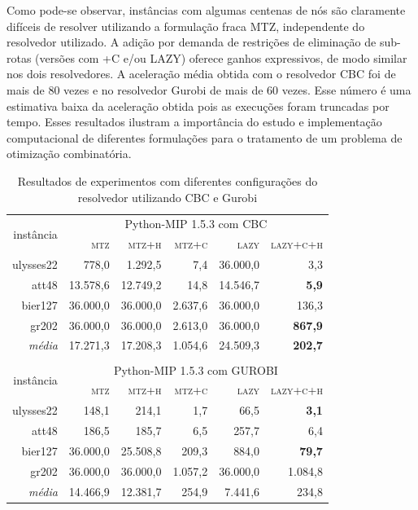 \documentclass[a4paper,11pt,fleqn]{article}
\begin{document}
Como pode-se observar, instâncias com algumas centenas de nós são claramente difíceis de resolver utilizando a formulação fraca MTZ, independente do resolvedor utilizado. A adição por demanda de restrições de eliminação de sub-rotas (versões com +C e/ou LAZY) oferece ganhos expressivos, de modo similar nos dois resolvedores. A aceleração média obtida com o resolvedor CBC foi de mais de 80 vezes e no resolvedor Gurobi de mais de 60 vezes. Esse número é uma estimativa baixa da aceleração obtida pois as execuções foram truncadas por tempo. Esses resultados ilustram a importância do estudo e implementação computacional de diferentes formulações para o tratamento de um problema de otimização combinatória.

\begin{table}
	\begin{center}		
\begin{tabular}{|r|r|r|r|r|r|}
\hline 
\multirow{2}{*}{instância} & \multicolumn{5}{c|}{Python-MIP 1.5.3 com CBC}\tabularnewline
\cline{2-6} \cline{3-6} \cline{4-6} \cline{5-6} \cline{6-6} 
 & \textsc{mtz} & \textsc{mtz+h} & \textsc{mtz+c} & \textsc{lazy} & \textsc{lazy+c+h}\tabularnewline
\hline 
\hline 
ulysses22 & 778,0 & 1.292,5 & 7,4 & \cellcolor{gray}36.000,0 & 3,3\tabularnewline
\hline 
att48 & 13.578,6 & 12.749,2 & 14,8 & 14.546,7 & \textbf{5,9}\tabularnewline
\hline 
bier127 & \cellcolor{gray}36.000,0 & \cellcolor{gray}36.000,0 & 2.637,6 & \cellcolor{gray}36.000,0 & 136,3\tabularnewline
\hline 
gr202 & \cellcolor{gray}36.000,0 & \cellcolor{gray}36.000,0 & 2.613,0 & \cellcolor{gray}36.000,0 & \textbf{867,9}\tabularnewline
\hline 
\hline 
\emph{média} & 17.271,3 & 17.208,3 & 1.054,6 & 24.509,3 & \textbf{202,7}\tabularnewline
\hline 
\multicolumn{1}{r}{} & \multicolumn{1}{r}{} & \multicolumn{1}{r}{} & \multicolumn{1}{r}{} & \multicolumn{1}{r}{} & \multicolumn{1}{r}{}\tabularnewline
\hline 
\multirow{2}{*}{instância} & \multicolumn{5}{c|}{Python-MIP 1.5.3 com GUROBI}\tabularnewline
\cline{2-6} \cline{3-6} \cline{4-6} \cline{5-6} \cline{6-6} 
 & \textsc{mtz} & \textsc{mtz+h} & \textsc{mtz+c} & \textsc{lazy} & \textsc{lazy+c+h}\tabularnewline
\hline 
\hline 
ulysses22 & 148,1 & 214,1 & 1,7 & 66,5 & \textbf{3,1}\tabularnewline
\hline 
att48 & 186,5 & 185,7 & 6,5 & 257,7 & 6,4\tabularnewline
\hline 
bier127 & \cellcolor{gray}36.000,0 & 25.508,8 & 209,3 & 884,0 & \textbf{79,7}\tabularnewline
\hline 
gr202 & \cellcolor{gray}36.000,0 & \cellcolor{gray}36.000,0 & 1.057,2 & 36.000,0 & 1.084,8\tabularnewline
\hline 
\hline 
\emph{média} & 14.466,9 & 12.381,7 & 254,9 & 7.441,6 & 234,8\tabularnewline
\hline 
\end{tabular}

	\label{resExp} \caption{Resultados de experimentos com diferentes configurações do resolvedor utilizando CBC e Gurobi}
	\end{center}	
\end{table}
\end{document}

